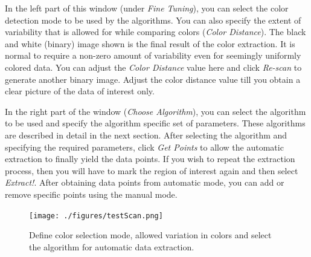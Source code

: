 \documentclass[letterpaper, 10pt]{article}
\begin{document}
In the left part of this window (under \emph{Fine Tuning}), you can select the color detection mode to be used by the algorithms. You can also specify the extent of variability that is allowed for while comparing colors (\emph{Color Distance}). The black and white (binary) image shown is the final result of the color extraction. It is normal to require a non-zero amount of variability even for seemingly uniformly colored data. You can adjust the \emph{Color Distance} value here and click \emph{Re-scan} to generate another binary image. Adjust the color distance value till you obtain a clear picture of the data of interest only.

In the right part of the window (\emph{Choose Algorithm}), you can select the algorithm to be used and specify the algorithm specific set of parameters. These algorithms are described in detail in the next section. After selecting the algorithm and specifying the required parameters, click \emph{Get Points} to allow the automatic extraction to finally yield the data points. If you wish to repeat the extraction process, then you will have to mark the region of interest again and then select \emph{Extract!}. After obtaining data points from automatic mode, you can add or remove specific points using the manual mode.

\begin{figure}
\begin{center}
\texttt{[image: ./figures/testScan.png]}
\caption{Define color selection mode, allowed variation in colors and select the algorithm for automatic data extraction.}
\label{fig:testScan}
\end{center}
\end{figure}
\end{document}
